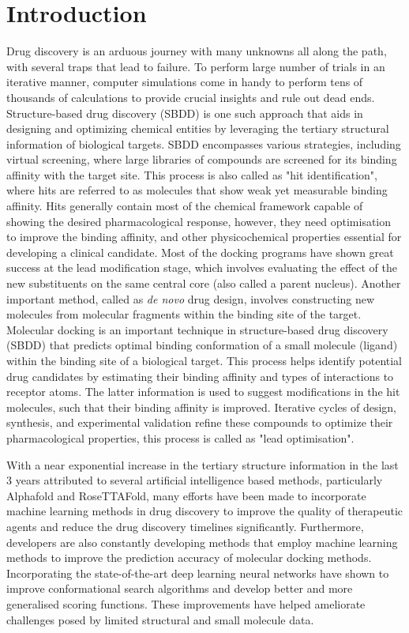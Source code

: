 \chapter*{Introduction}
Drug discovery\cite{bib32} is an arduous journey with many unknowns all along the path, with several traps that lead to failure. To perform large number of trials in an iterative manner, computer simulations\cite{bib33, bib34} come in handy to perform tens of thousands of calculations to provide crucial insights and rule out dead ends. Structure-based drug discovery (SBDD) is one such approach that aids in designing and optimizing chemical entities by leveraging the tertiary structural information of biological targets. SBDD encompasses various strategies, including virtual screening, where large libraries of compounds are screened for its binding affinity with the target site. This process is also called as "hit identification", where hits are referred to as molecules that show weak yet measurable binding affinity. Hits generally contain most of the chemical framework capable of showing the desired pharmacological response, however, they need optimisation to improve the binding affinity, and other physicochemical properties essential for developing a clinical candidate. Most of the docking programs have shown great success at the lead modification stage, which involves evaluating the effect of the new substituents on the same central core (also called a parent nucleus)\cite{bib53}. 
Another important method, called as \textit{de novo} drug design, involves constructing new molecules from molecular fragments within the binding site of the target.  Molecular docking\cite{bib35} is an important technique in structure-based drug discovery (SBDD) that predicts optimal binding conformation of a small molecule (ligand) within the binding site of a biological target. This process helps identify potential drug candidates by estimating their binding affinity and types of interactions to receptor atoms. The latter information is used to suggest modifications in the hit molecules, such that their binding affinity is improved. Iterative cycles of design, synthesis, and experimental validation refine these compounds to optimize their pharmacological properties, this process is called as "lead optimisation". 

With a near exponential increase in the tertiary structure information in the last 3 years attributed to several artificial intelligence based methods, particularly Alphafold\cite{bib37} and RoseTTAFold\cite{bib38}, many efforts have been made to incorporate machine learning methods in drug discovery to improve the quality of therapeutic agents and reduce the drug discovery timelines significantly\cite{bib36}. Furthermore, developers are also constantly developing methods that employ machine learning methods to improve the prediction accuracy of molecular docking methods. Incorporating the state-of-the-art deep learning neural networks have shown to improve conformational search algorithms and develop better and more generalised scoring functions. These improvements have helped ameliorate challenges posed by limited structural and small molecule data\cite{bib39, bib40}. 


